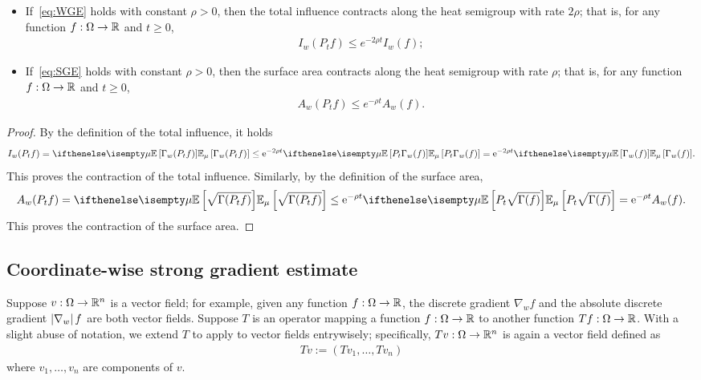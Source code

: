 \begin{proposition}
    \quad
    \begin{itemize}
        \item If~\ref{eq:WGE} holds with constant $\rho > 0$, then the total influence contracts along the heat semigroup with rate $2\rho$; that is, for any function $f: \Omega \to \mathbb{R}$ and $t \ge 0$,
        \begin{align*}
            I_w(P_t f) \leq e^{-2\rho t} I_w(f); \tag{$I$-contraction}
        \end{align*}
        
        \item If~\ref{eq:SGE} holds with constant $\rho > 0$, then the surface area contracts along the heat semigroup with rate $\rho$; that is, for any function $f: \Omega \to \mathbb{R}$ and $t \ge 0$,
        \begin{align*}
            A_w(P_t f) \leq e^{-\rho t} A_w(f). \tag{$A$-contraction}
        \end{align*}   
    \end{itemize}
\end{proposition}

\begin{proof}
By the definition of the total influence, it holds
\begin{align*}
    I_w(P_t f) = \E[\mu]{\Gamma_w(P_t f)} \le \e^{-2 \rho t} \E[\mu]{P_t \Gamma_w(f)} = \e^{-2 \rho t} \E[\mu]{\Gamma_w(f)}.
\end{align*}
This proves the contraction of the total influence. 
Similarly, by the definition of the surface area, 
\begin{align*}
    A_w(P_t f) = \E[\mu]{\sqrt{\Gamma(P_t f)}} \le \e^{-\rho t} \E[\mu]{P_t \sqrt{\Gamma(f)}} = \e^{-\rho t} A_w(f).
\end{align*}
This proves the contraction of the surface area.
\end{proof}

\subsection{Coordinate-wise strong gradient estimate}
Suppose $v: \Omega \to \mathbb{R}^n$ is a vector field; for example, given any function $f: \Omega \to \mathbb{R}$, the discrete gradient $\nabla_w f$ and the absolute discrete gradient $\left\vert\nabla_w\right\vert f$ are both vector fields.
Suppose $T$ is an operator mapping a function $f: \Omega \to \mathbb{R}$ to another function $Tf: \Omega \to \mathbb{R}$.
With a slight abuse of notation, we extend $T$ to apply to vector fields entrywisely; specifically, $T v: \Omega \to \mathbb{R}^n$ is again a vector field defined as
\begin{align*}
    T v := (T v_1,\dots,T v_n)
\end{align*}
where $v_1,\dots,v_n$ are components of $v$.

